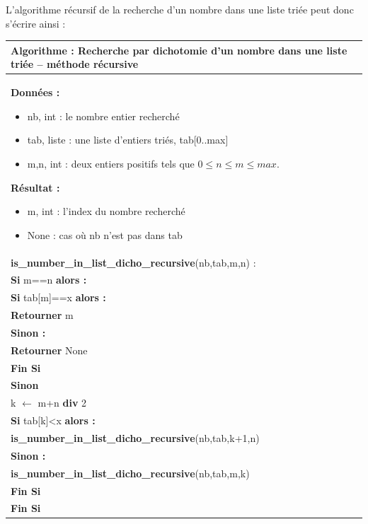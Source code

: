 \documentclass[10pt,fleqn]{article} %
\newcommand{\bfsf}[1]{\small\textbf{\textsf{#1}}}%
\newcommand{\tsf}[1]{\small{\textsf{#1}}}
\begin{document}
L'algorithme récursif de la recherche d'un nombre dans une liste triée peut donc s'écrire ainsi :


\begin{center}
\begin{tabular}{p{}}
\hline
\textbf{Algorithme :} Recherche par dichotomie d'un nombre dans une liste triée -- méthode récursive\\
\hline
\textbf{Données :}
\begin{itemize}
\item \tsf{nb}, int : le nombre entier recherché 
\item \tsf{tab}, liste : une liste d'entiers triés, tab[0..max]
\item \tsf{m,n}, int : deux entiers positifs tels que $0\leq n\leq m \leq max$.
\end{itemize}
\textbf{Résultat :} 
\begin{itemize}
\item \tsf{m}, int : l'index du nombre recherché
\item \tsf{None} : cas où \tsf{nb} n'est pas dans \tsf{tab}
\end{itemize}
\\
\bfsf{is\_number\_in\_list\_dicho\_recursive}(\tsf{nb},\tsf{tab},\tsf{m},\tsf{n}) :\\
\hspace{.4cm} \bfsf{Si} \tsf{m==n} \bfsf{alors :}\\
\hspace{.8cm} \bfsf{Si} \tsf{tab[m]==x} \bfsf{alors :}\\
\hspace{1.2cm} \bfsf{Retourner} \tsf{m}\\
\hspace{.8cm} \bfsf{Sinon :}\\
\hspace{1.2cm} \bfsf{Retourner} \tsf{None}\\
\hspace{.8cm} \bfsf{Fin Si}\\
\hspace{.4cm} \bfsf{Sinon}\\
\hspace{.8cm} \tsf{k} $\leftarrow$ \tsf{m+n} \bfsf{div} 2\\
\hspace{.8cm} \bfsf{Si} \tsf{tab[k]<x} \bfsf{alors :}\\
\hspace{1.2cm} \bfsf{is\_number\_in\_list\_dicho\_recursive}(\tsf{nb},\tsf{tab},\tsf{k+1},\tsf{n}) \\ 
\hspace{.8cm} \bfsf{Sinon :}\\
\hspace{1.2cm} \bfsf{is\_number\_in\_list\_dicho\_recursive}(\tsf{nb},\tsf{tab},\tsf{m},\tsf{k}) \\ 
\hspace{.8cm} \bfsf{Fin Si}\\
\hspace{.4cm} \bfsf{Fin Si}\\
\hline
\end{tabular}
\end{center}
\end{document}
